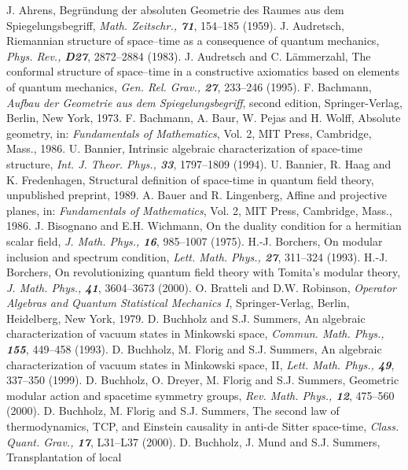 \documentclass[a4paper,twoside,12pt]{article}
\begin{document}
\begin{thebibliography}{Bor}
J. Ahrens, Begr\"undung der absoluten Geometrie des Raumes aus dem
Spiegelungsbegriff, {\sl Math. Zeitschr., \bf 71}, 154--185 (1959).
J. Audretsch, Riemannian structure of space--time as a 
consequence of quantum mechanics, {\sl Phys. Rev., \bf D27}, 2872--2884
(1983).
J. Audretsch and C. L\"ammerzahl, The conformal structure
of space--time in a constructive axiomatics based on elements of
quantum mechanics, {\sl Gen. Rel. Grav., \bf 27}, 233--246 (1995).
F. Bachmann, {\it Aufbau der Geometrie aus dem Spiegelungsbegriff},
second edition, Springer-Verlag, Berlin, New York, 1973.
F. Bachmann, A. Baur, W. Pejas and H. Wolff, Absolute
geometry, in: {\it Fundamentals of Mathematics}, Vol. 2, MIT Press, 
Cambridge, Mass., 1986.
U. Bannier, Intrinsic algebraic characterization of space-time 
structure, {\sl Int. J. Theor. Phys., \bf 33}, 1797--1809 (1994). 
U. Bannier, R. Haag and K. Fredenhagen, Structural definition of
space-time in quantum field theory, unpublished preprint, 1989.
A. Bauer and R. Lingenberg, Affine and projective planes, in:
{\it Fundamentals of Mathematics}, Vol. 2, MIT Press, Cambridge, Mass., 1986.
J. Bisognano and E.H. Wichmann, On the duality condition for a 
hermitian scalar field, {\sl J. Math. Phys., \bf 16}, 985--1007 (1975).
H.-J. Borchers, On modular inclusion and spectrum condition, 
{\sl Lett. Math. Phys., \bf 27}, 311--324 (1993).
H.-J. Borchers, On revolutionizing quantum field theory with 
Tomita's modular theory, {\sl J. Math. Phys., \bf 41}, 3604--3673 (2000).
O. Bratteli and D.W. Robinson, {\it Operator Algebras and
Quantum Statistical Mechanics I}, Springer-Verlag, Berlin, Heidelberg, 
New York, 1979.
D. Buchholz and S.J. Summers, An algebraic characterization of 
vacuum states in Minkowski space, {\sl Commun. Math. Phys., \bf 155}, 
449--458 (1993).
D. Buchholz, M. Florig and S.J. Summers, An algebraic 
characterization of vacuum states in Minkowski space, II, {\sl Lett. Math.
Phys., \bf 49}, 337--350 (1999).
D. Buchholz, O. Dreyer, M. Florig and S.J. Summers, Geometric 
modular action and spacetime symmetry groups, {\sl Rev. Math. Phys., \bf 12}, 
475--560 (2000).
D. Buchholz, M. Florig and S.J. Summers, The second law of 
thermodynamics, TCP, and Einstein causality in anti-de Sitter space-time, 
{\sl Class. Quant. Grav., \bf 17}, L31--L37 (2000).
D. Buchholz, J. Mund and S.J. Summers, Transplantation of local 

\end{thebibliography}
\end{document}
